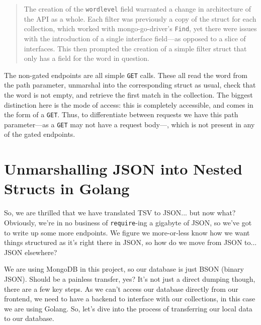\documentclass[11pt, twoside, reqno]{book}
\begin{document}
\begin{quote}
The creation of the \texttt{wordlevel} field warranted a change in architecture of the API as a whole. Each filter was previously a copy of the struct for each collection, which worked with mongo-go-driver's \texttt{Find}, yet there were issues with the introduction of a single interface field—as opposed to a slice of interfaces. This then prompted the creation of a simple filter struct that only has a field for the word in question.
\end{quote}

The non-gated endpoints are all simple \texttt{GET} calls. These all read the word from the path parameter, unmarshal into the corresponding struct as usual, check that the word is not empty, and retrieve the first match in the collection. The biggest distinction here is the mode of access: this is completely accessible, and comes in the form of a \texttt{GET}. Thus, to differentiate between requests we have this path parameter—as a \texttt{GET} may not have a request body—, which is not present in any of the gated endpoints.

\section{Unmarshalling JSON into Nested Structs in Golang}

So, we are thrilled that we have translated TSV to JSON... but now what? Obviously, we're in no business of \texttt{require}-ing a gigabyte of JSON, so we've got to write up some more endpoints. We figure we more-or-less know how we want things structured as it's right there in JSON, so how do we move from JSON to... \textit{}JSON elsewhere\textit{}?

We are using MongoDB in this project, so our database is just BSON (binary JSON). Should be a painless transfer, yes? It's not just a direct dumping though, there are a few key steps. As we can't access our database directly from our frontend, we need to have a backend to interface with our collections, in this case we are using Golang. So, let's dive into the process of transferring our local data to our database.
\end{document}

